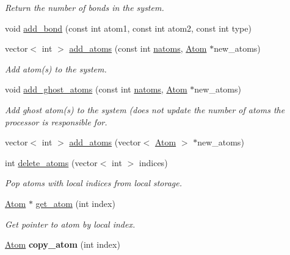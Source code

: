 \begin{DoxyCompactItemize}
\begin{DoxyCompactList}\small\item\em Return the number of bonds in the system. \end{DoxyCompactList}\item 
void \hyperlink{classsim__system_1_1System_af059db3b5eca6f008ff4431077474f84}{add\-\_\-bond} (const int atom1, const int atom2, const int type)
\item 
vector$<$ int $>$ \hyperlink{classsim__system_1_1System_a05826b39bf1e45c6687944660f4a6bd0}{add\-\_\-atoms} (const int \hyperlink{classsim__system_1_1System_a644ace6a33a7190c7765a94f04f75e0e}{natoms}, \hyperlink{structatom_1_1Atom}{Atom} $\ast$new\-\_\-atoms)
\begin{DoxyCompactList}\small\item\em Add atom(s) to the system. \end{DoxyCompactList}\item 
void \hyperlink{classsim__system_1_1System_a9131d081a3fb094cfec0007e59f37866}{add\-\_\-ghost\-\_\-atoms} (const int \hyperlink{classsim__system_1_1System_a644ace6a33a7190c7765a94f04f75e0e}{natoms}, \hyperlink{structatom_1_1Atom}{Atom} $\ast$new\-\_\-atoms)
\begin{DoxyCompactList}\small\item\em Add ghost atom(s) to the system (does not update the number of atoms the processor is responsible for. \end{DoxyCompactList}\item 
vector$<$ int $>$ \hyperlink{classsim__system_1_1System_a7f8b02504a0597dad634094e0422734f}{add\-\_\-atoms} (vector$<$ \hyperlink{structatom_1_1Atom}{Atom} $>$ $\ast$new\-\_\-atoms)
\item 
int \hyperlink{classsim__system_1_1System_aa1efe35fa687d9139ada9d520f137da0}{delete\-\_\-atoms} (vector$<$ int $>$ indices)
\begin{DoxyCompactList}\small\item\em Pop atoms with local indices from local storage. \end{DoxyCompactList}\item 
\hypertarget{classsim__system_1_1System_ac4a48715a5d4af3051334acb40ec5650}{\hyperlink{structatom_1_1Atom}{Atom} $\ast$ \hyperlink{classsim__system_1_1System_ac4a48715a5d4af3051334acb40ec5650}{get\-\_\-atom} (int index)}\label{classsim__system_1_1System_ac4a48715a5d4af3051334acb40ec5650}

\begin{DoxyCompactList}\small\item\em Get pointer to atom by local index. \end{DoxyCompactList}\item 
\hypertarget{classsim__system_1_1System_aee4dadeeff36950e66068c26c3698dcd}{\hyperlink{structatom_1_1Atom}{Atom} {\bfseries copy\-\_\-atom} (int index)}\label{classsim__system_1_1System_aee4dadeeff36950e66068c26c3698dcd}


\end{DoxyCompactItemize}
